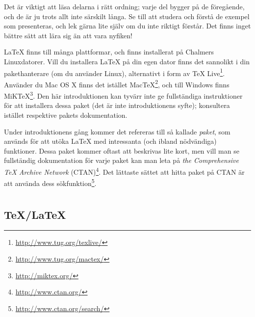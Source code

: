 \documentclass[swe,12pt]{skrapport}
\makeatletter
\newcommand\expl@kod[3][]{\inputminted[frame=single,#1]{latex}{#3.tex}}
\newcommand\expl@fig[3][]{\fbox{\texttt{[image: \#3.pdf]}}}
\newcommand\expl@input[3][]{\expl@kod[#1]{}{#3}\vspace{1ex}\expl@fig{#2}{#3}}
\newenvironment{exempel}{\begin{expl@eenv}[tbp]\let\exempel=\expl@input}{\end{expl@eenv}}
\newenvironment{kod}{\begin{expl@kenv}[tbp]\let\exempel=\expl@kod}{\end{expl@kenv}}
\newcommand\kodrad[2]{\hspace{1ex}\inputminted[firstline=#1,lastline=#1]{latex}{#2.tex}}
\let\section@old=\section
\renewcommand\section{\@ifstar\my@section@star\my@section}
\newcommand\my@section[2][\@empty]{\newpage\ifx\@empty#1\section@old{#2}\else\section@old[#1]{#2}\fi}
\newcommand\my@section@star[2][\@empty]{\newpage\ifx\@empty#1\section@old*{#2}\else\section@old*[#1]{#2}\fi}
\makeatother
\begin{document}
	Det är viktigt att läsa delarna i rätt ordning; varje del bygger på de
	föregående, och de är ju trots allt inte särskilt långa. Se till att
	studera och förstå de exempel som presenteras, och lek gärna lite själv
	om du inte riktigt förstår. Det finns inget bättre sätt att lära sig än
	att vara nyfiken!
	
	\LaTeX{} finns till många plattformar, och finns installerat på Chalmers
	Linuxdatorer. Vill du installera \LaTeX{} på din egen dator finns det
	sannolikt i din pakethanterare (om du använder Linux), alternativt i form
	av \TeX{} Live\footnote{\url{http://www.tug.org/texlive/}}. Använder du
	Mac OS X finns det istället
	Mac\TeX\footnote{\url{http://www.tug.org/mactex/}}, och till Windows finns
	MiK\TeX\footnote{\url{http://miktex.org/}}. Den här introduktionen kan
	tyvärr inte ge fullständiga instruktioner för att installera dessa paket
	(det är inte introduktionens syfte);
	konsultera istället respektive pakets dokumentation.
	
	Under introduktionens gång kommer det refereras till så kallade
	\emph{paket}, som används för att utöka \LaTeX{} med intressanta (och
	ibland nödvändiga) funktioner. Dessa paket kommer oftast att beskrivas
	lite kort, men vill man se fullständig dokumentation för varje paket
	kan man leta på \emph{the Comprehensive \TeX{} Archive Network}
	(CTAN)\footnote{\url{http://www.ctan.org/}}. Det lättaste sättet att hitta
	paket på CTAN är att använda dess
	sökfunktion\footnote{\url{http://www.ctan.org/search/}}.
	
	
	
	
	\section{Grundläggande begrepp}\label{sec:1}
	
	\subsection{\TeX/\LaTeX}
	
\end{document}
